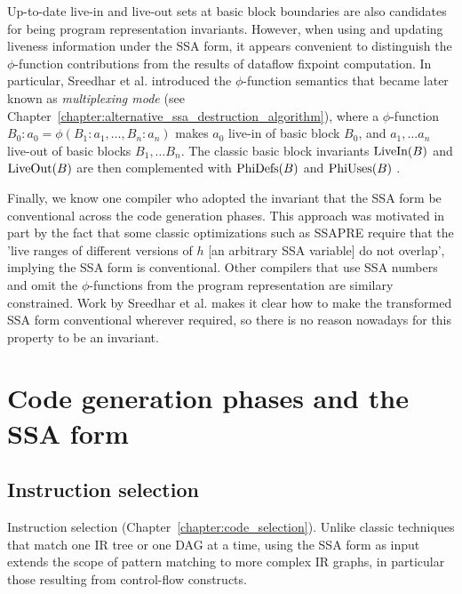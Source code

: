 Up-to-date live-in and live-out sets at basic block boundaries are also
candidates for being program representation invariants. However, when using and
updating liveness information under the SSA form, it appears convenient to
distinguish the $\phi$-function contributions from the results of dataflow
fixpoint computation.  In particular, Sreedhar et al.  \cite{SreedharSep99}
introduced the $\phi$-function semantics that became later known as
\emph{multiplexing mode} (see
Chapter~\ref{chapter:alternative_ssa_destruction_algorithm}), where a
$\phi$-function $B_0:a_0=\phi(B_1:a_1,\dots,B_n:a_n)$ makes $a_0$ live-in of
basic block $B_0$, and $a_1,\dots a_n$ live-out of basic blocks $B_1,\dots B_n$.
The classic basic block invariants $\hbox{LiveIn}(B)$ and $\hbox{LiveOut}(B)$
are then complemented with $\hbox{PhiDefs}(B)$ and $\hbox{PhiUses}(B)$
\cite{Boissinot:2011:APLAS}.

Finally, we know one compiler who adopted the invariant that the SSA form be
conventional across the code generation phases. This approach was motivated in
part by the fact that some classic optimizations such as SSAPRE \cite{CCK+97}
require that the 'live ranges of different versions of $h$ [an arbitrary SSA
variable] do not overlap', implying the SSA form is conventional. Other
compilers that use SSA numbers and omit the $\phi$-functions from the program
representation \cite{Lapkowski:1996:CASCON} are similary constrained. Work by
Sreedhar et al. \cite{SreedharSep99} makes it clear how to make the transformed
SSA form conventional wherever required, so there is no reason nowadays for this
property to be an invariant.




\section{Code generation phases and the SSA form}
\label{sec:ssa-codegen-suitability}

\subsection{Instruction selection}

Instruction selection (Chapter~\ref{chapter:code_selection}). Unlike
classic techniques that match one IR tree or one DAG at a time, using the SSA
form as input extends the scope of pattern matching to more complex IR graphs,
in particular those resulting from control-flow constructs.

